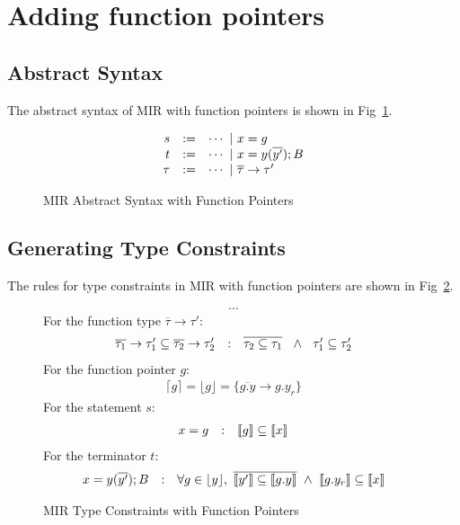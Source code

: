 \documentclass[peerreview, 10pt]{IEEEtran}
\newcommand{\cons}[1]{\ensuremath{\llbracket#1\rrbracket}}
\newcommand{\floor}[1]{\ensuremath{\lfloor#1\rfloor}}
\newcommand{\ceil}[1]{\ensuremath{\lceil#1\rceil}}
\newcommand{\ifrule}[2]{\ensuremath{#1&:&#2}}
\begin{document}
\section{Adding function pointers}

\subsection{Abstract Syntax}
The abstract syntax of MIR with function pointers is shown in Fig~\ref{fig:mir-funcptrs-absyn}.
\begin{figure}[ht]
\centering
\begin{framed}
\[
  \begin{array}{@{}rcl@{}}
    s &:=& \cdots\ |\ x=g \\
    t &:=& \cdots\ |\ x=y(\overline{y'}); B \\
    \tau &:=& \cdots\ |\ \overline{\tau}\rightarrow\tau' \\
  \end{array}
\]
\end{framed}
\caption{MIR Abstract Syntax with Function Pointers}
\label{fig:mir-funcptrs-absyn}
\end{figure}

\subsection {Generating Type Constraints}

The rules for type constraints in MIR with function pointers are shown in Fig~\ref{fig:mir-funcptrs-type-constraints}.

\begin{figure}[ht]
\begin{framed}
\[\cdots\]
For the function type $\overline{\tau}\rightarrow\tau'$:
\[\begin{array}{@{}ccl@{}}
  \ifrule{\overline{\tau_1}\rightarrow\tau_1'\subseteq\overline{\tau_2}\rightarrow\tau_2'}{
    \overline{\tau_2\subseteq\tau_1}\ \ \land\ \ \tau_1'\subseteq\tau_2'
  }
\end{array}\]
For the function pointer $g$:
\[
\begin{gathered}
  \ceil{g} = \floor{g} = \{ \overline {g.y} \rightarrow g.y_r\}
\end{gathered}
\]
For the statement $s$:
\[
\begin{array}{@{}ccl@{}}
  \ifrule{x=g}{\cons{g}\subseteq\cons{x}}\\
\end{array}\]
For the terminator $t$:
\[\begin{array}{@{}ccl@{}}
  \ifrule{x=y(\overline{y'}); B}{
    \forall g\in\floor{y},\ \overline{\cons{y'}\subseteq\cons{g.y}}\ \land\ \cons{g.y_r}\subseteq\cons{x}
  }
\end{array}\]
\end{framed}
\caption{MIR Type Constraints with Function Pointers}
\label{fig:mir-funcptrs-type-constraints}
\end{figure}
\end{document}
